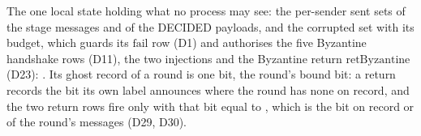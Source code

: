 \begin{definition}
  \label{def:aba-netadv}
  \leanok
  The one local state holding what no process may see: the per-sender sent sets of the stage messages and of the DECIDED payloads, and the corrupted set with its budget, which guards its $\mathrm{fail}$ row (D1) and authorises the five Byzantine handshake rows (D11), the two injections and the Byzantine return $\mathrm{retByzantine}$ (D23): .
  Its ghost record of a round is one bit, the round's bound bit: a return records the bit its own label announces where the round has none on record, and the two return rows fire only with that bit equal to , which is the bit on record or  of the round's messages (D29, D30).
\end{definition}
